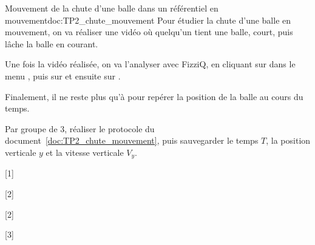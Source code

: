\begin{doc}{Mouvement de la chute d'une balle dans un référentiel en mouvement}{doc:TP2_chute_mouvement}
  Pour étudier la chute d'une balle en mouvement, on va réaliser une vidéo où quelqu'un tient une balle, court, puis lâche la balle en courant.
  
  Une fois la vidéo réalisée, on va l'analyser avec FizziQ, en cliquant sur  dans le menu , puis sur  et ensuite sur .
  
  Finalement, il ne reste plus qu'à  pour repérer la position de la balle au cours du temps.
\end{doc}

\mesure Par groupe de 3, réaliser le protocole du document~\ref{doc:TP2_chute_mouvement}, puis sauvegarder le temps $T$, la position verticale $y$ et la vitesse verticale $V_y$.

[1]

[2]

[2]

[3]